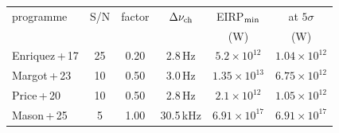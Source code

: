 \begin{tabular}{@{}lccccc@{}}
\toprule
programme & S/N & factor & $\Delta\nu_{\rm ch}$ & EIRP$_{\rm min}$ & at $5\sigma$ \\
 & & & & (W) & (W) \\
\midrule
Enriquez\,+\,17 & 25 & 0.20 & 2.8\,Hz & $5.2\times10^{12}$ & $1.04\times10^{12}$ \\
Margot\,+\,23 & 10 & 0.50 & 3.0\,Hz & $1.35\times10^{13}$ & $6.75\times10^{12}$ \\
Price\,+\,20 & 10 & 0.50 & 2.8\,Hz & $2.1\times10^{12}$ & $1.05\times10^{12}$ \\
Mason\,+\,25 & 5 & 1.00 & 30.5\,kHz & $6.91\times10^{17}$ & $6.91\times10^{17}$ \\
\bottomrule
\end{tabular}
